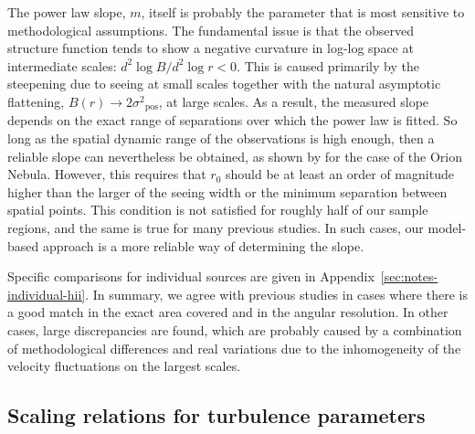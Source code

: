 \documentclass[fleqn,usenatbib, useAMS, a4paper]{mnras}
\newcommand\pos{\ensuremath{_{\mathrm{pos}}}}
\begin{document}
The power law slope, \(m\), itself is probably the parameter that
is most sensitive to methodological assumptions.
The fundamental issue is that the observed structure function tends to
show a negative curvature in log-log space at intermediate scales:
\(d^2 \log B/ d^2 \log r < 0\).
This is caused primarily by the steepening due to seeing at small scales
together with the natural asymptotic flattening, 
\(B(r) \to 2 \sigma^2\pos\), at large scales.
As a result, the measured slope depends on the exact range of
separations over which the power law is fitted.
So long as the spatial dynamic range of the observations is high enough,
then a reliable slope can nevertheless be obtained,
as shown by \citet{arthur2016turbulence} for the case of the Orion Nebula.
However, this requires that \(r_0\) should be at least an order of
magnitude higher than the larger of the seeing width
or the minimum separation between spatial points.
This condition is not satisfied for roughly half of our sample regions,
and the same is true for many previous studies.
In such cases, our model-based approach is a more reliable way of
determining the slope. 

Specific comparisons for individual sources are given
in Appendix~\ref{sec:notes-individual-hii}.
In summary, we agree with previous studies in cases where there
is a good match in the exact area covered and in the angular resolution.
In other cases, large discrepancies are found,
which are probably caused by a combination of methodological differences
and real variations due to the inhomogeneity of the
velocity fluctuations on the largest scales.

\subsection{Scaling relations for turbulence parameters}\label{sec:scaling-relations}
\end{document}
